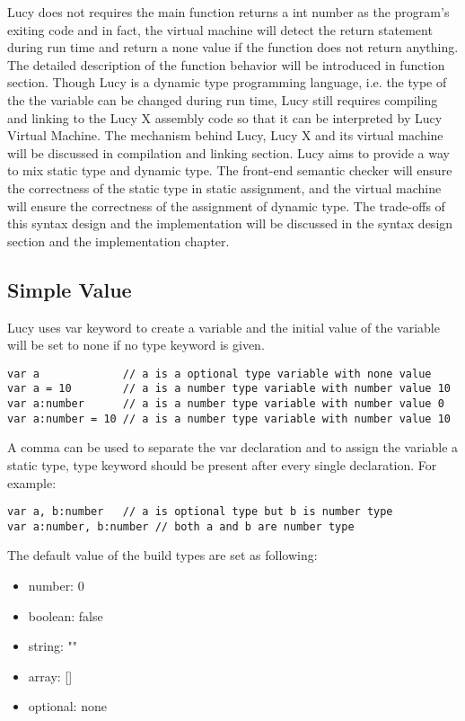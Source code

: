 Lucy does not requires the main function returns a int number as the program's exiting code and in fact, the virtual machine will detect the return statement during run time and return a none value if the function does not return anything. The detailed description of the function behavior will be introduced in function section. Though Lucy is a dynamic type programming language, i.e. the type of the the variable can be changed during run time, Lucy still requires compiling and linking to the Lucy X assembly code so that it can be interpreted by Lucy Virtual Machine. The mechanism behind Lucy, Lucy X and its virtual machine will be discussed in compilation and linking section. Lucy aims to provide a way to mix static type and dynamic type. The front-end semantic checker will ensure the correctness of the static type in static assignment, and the virtual machine will ensure the correctness of the assignment of dynamic type. The trade-offs of this syntax design and the implementation will be discussed in the syntax design section and the implementation chapter.

\subsection{Simple Value}
Lucy uses var keyword to create a variable and the initial value of the variable will be set to none if no type keyword is given.
\begin{lstlisting}
var a             // a is a optional type variable with none value
var a = 10        // a is a number type variable with number value 10
var a:number      // a is a number type variable with number value 0
var a:number = 10 // a is a number type variable with number value 10
\end{lstlisting}
A comma can be used to separate the var declaration and to assign the variable a static type, type keyword should be present after every single declaration. For example:
\begin{lstlisting}
var a, b:number   // a is optional type but b is number type
var a:number, b:number // both a and b are number type
\end{lstlisting}
The default value of the build types are set as following:
\begin{itemize}
  \item number: 0
  \item boolean: false
  \item string: ""
  \item array: []
  \item optional: none
\end{itemize}

